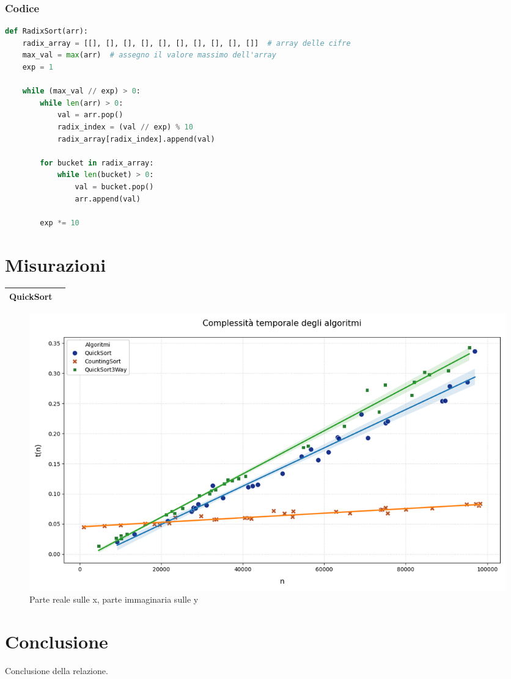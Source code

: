 \documentclass[a4paper, 11pt]{article}
\begin{document}
\subsubsection{Codice}
\begin{lstlisting}[style=mycodestyle, language=Python]
def RadixSort(arr):
    radix_array = [[], [], [], [], [], [], [], [], [], []]  # array delle cifre
    max_val = max(arr)  # assegno il valore massimo dell'array
    exp = 1 

    while (max_val // exp) > 0:
        while len(arr) > 0:
            val = arr.pop()
            radix_index = (val // exp) % 10
            radix_array[radix_index].append(val)

        for bucket in radix_array:
            while len(bucket) > 0:
                val = bucket.pop()
                arr.append(val)

        exp *= 10
\end{lstlisting}

\section{Misurazioni}

\begin{table} [H]
    \centering
    \begin{tabular}{|c|c|}
        \hline
        QuickSort \\ [0.1 cm]
        \hline
    \end{tabular}
\end{table}

\begin{figure} [H]
    \centering
    \includegraphics[scale=0.5]{Immagini/Grafico.png}
    \caption*{Parte reale sulle x, parte immaginaria sulle y}
\end{figure}

\section{Conclusione}
Conclusione della relazione.
\end{document}
